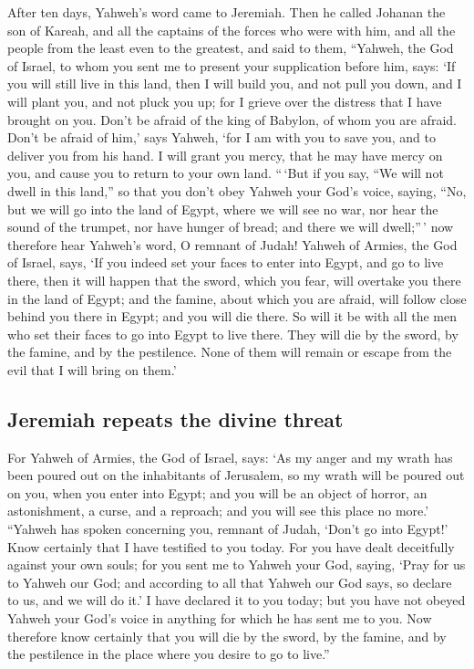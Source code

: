  After ten days, Yahweh's word came to Jeremiah.
 Then he called Johanan the son of Kareah, and all the
captains of the forces who were with him, and all the people from the
least even to the greatest,  and said to them, ``Yahweh,
the God of Israel, to whom you sent me to present your supplication
before him, says:  `If you will still live in this land,
then I will build you, and not pull you down, and I will plant you, and
not pluck you up; for I grieve over the distress that I have brought on
you.  Don't be afraid of the king of Babylon, of whom you
are afraid. Don't be afraid of him,' says Yahweh, `for I am with you to
save you, and to deliver you from his hand.  I will grant
you mercy, that he may have mercy on you, and cause you to return to
your own land.  ``\,`But if you say, ``We will not dwell
in this land,'' so that you don't obey Yahweh your God's voice,
 saying, ``No, but we will go into the land of Egypt,
where we will see no war, nor hear the sound of the trumpet, nor have
hunger of bread; and there we will dwell;''\,'  now
therefore hear Yahweh's word, O remnant of Judah! Yahweh of Armies, the
God of Israel, says, `If you indeed set your faces to enter into Egypt,
and go to live there,  then it will happen that the
sword, which you fear, will overtake you there in the land of Egypt; and
the famine, about which you are afraid, will follow close behind you
there in Egypt; and you will die there.  So will it be
with all the men who set their faces to go into Egypt to live there.
They will die by the sword, by the famine, and by the pestilence. None
of them will remain or escape from the evil that I will bring on them.'

\hypertarget{jeremiah-repeats-the-divine-threat}{%
\subsection{Jeremiah repeats the divine
threat}\label{jeremiah-repeats-the-divine-threat}}

 For Yahweh of Armies, the God of Israel, says: `As my
anger and my wrath has been poured out on the inhabitants of Jerusalem,
so my wrath will be poured out on you, when you enter into Egypt; and
you will be an object of horror, an astonishment, a curse, and a
reproach; and you will see this place no more.'  ``Yahweh
has spoken concerning you, remnant of Judah, `Don't go into Egypt!' Know
certainly that I have testified to you today.  For you
have dealt deceitfully against your own souls; for you sent me to Yahweh
your God, saying, `Pray for us to Yahweh our God; and according to all
that Yahweh our God says, so declare to us, and we will do it.'
 I have declared it to you today; but you have not obeyed
Yahweh your God's voice in anything for which he has sent me to you.
 Now therefore know certainly that you will die by the
sword, by the famine, and by the pestilence in the place where you
desire to go to live.''

